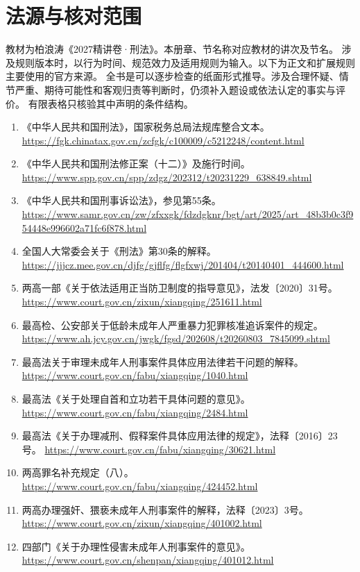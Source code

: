 \chapter{法源与核对范围}

教材为柏浪涛《2027精讲卷·刑法》。本册章、节名称对应教材的讲次及节名。
涉及规则版本时，以行为时间、规范效力及适用规则为输入。以下为正文和扩展规则主要使用的官方来源。
全书是可以逐步检查的纸面形式推导。涉及合理怀疑、情节严重、期待可能性和客观归责等判断时，仍须补入题设或依法认定的事实与评价。
有限表格只核验其中声明的条件结构。

\begin{enumerate}
 \item 《中华人民共和国刑法》，国家税务总局法规库整合文本。
 \url{https://fgk.chinatax.gov.cn/zcfgk/c100009/c5212248/content.html}
 \item 《中华人民共和国刑法修正案（十二）》及施行时间。
 \url{https://www.spp.gov.cn/spp/zdgz/202312/t20231229_638849.shtml}
 \item 《中华人民共和国刑事诉讼法》，参见第55条。
 \url{https://www.samr.gov.cn/zw/zfxxgk/fdzdgknr/bgt/art/2025/art_48b3b0c3f954448e996602a71fc6f878.html}
 \item 全国人大常委会关于《刑法》第30条的解释。
 \url{https://jjjcz.mee.gov.cn/djfg/gjflfg/flgfxwj/201404/t20140401_444600.html}
 \item 两高一部《关于依法适用正当防卫制度的指导意见》，法发〔2020〕31号。
 \url{https://www.court.gov.cn/zixun/xiangqing/251611.html}
 \item 最高检、公安部关于低龄未成年人严重暴力犯罪核准追诉案件的规定。
 \url{https://www.ah.jcy.gov.cn/jwgk/fgsd/202608/t20260803_7845099.shtml}
 \item 最高法关于审理未成年人刑事案件具体应用法律若干问题的解释。
 \url{https://www.court.gov.cn/fabu/xiangqing/1040.html}
 \item 最高法《关于处理自首和立功若干具体问题的意见》。
 \url{https://www.court.gov.cn/fabu/xiangqing/2484.html}
 \item 最高法《关于办理减刑、假释案件具体应用法律的规定》，法释〔2016〕23号。
 \url{https://www.court.gov.cn/fabu/xiangqing/30621.html}
 \item 两高罪名补充规定（八）。
 \url{https://www.court.gov.cn/fabu/xiangqing/424452.html}
 \item 两高办理强奸、猥亵未成年人刑事案件的解释，法释〔2023〕3号。
 \url{https://www.court.gov.cn/zixun/xiangqing/401002.html}
 \item 四部门《关于办理性侵害未成年人刑事案件的意见》。
 \url{https://www.court.gov.cn/shenpan/xiangqing/401012.html}

\end{enumerate}
